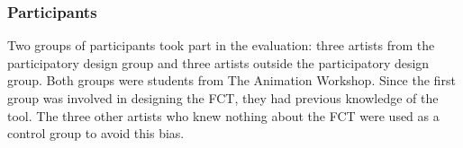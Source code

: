 \subsubsection{Participants}
Two groups of participants took part in the evaluation: three artists from the participatory design group and three artists outside the participatory design group. Both groups were students from The Animation Workshop. Since the first group was involved in designing the FCT, they had previous knowledge of the tool. The three other artists who knew nothing about the FCT were used as a control group to avoid this bias.